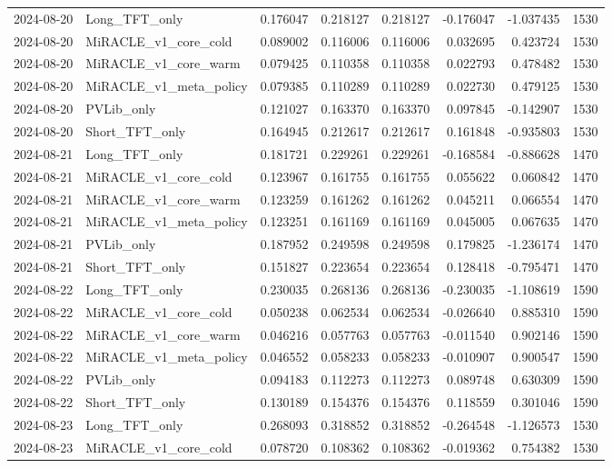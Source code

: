 \begin{tabular}{llrrrrrr}
2024-08-20 & Long_TFT_only & 0.176047 & 0.218127 & 0.218127 & -0.176047 & -1.037435 & 1530 \\
2024-08-20 & MiRACLE_v1_core_cold & 0.089002 & 0.116006 & 0.116006 & 0.032695 & 0.423724 & 1530 \\
2024-08-20 & MiRACLE_v1_core_warm & 0.079425 & 0.110358 & 0.110358 & 0.022793 & 0.478482 & 1530 \\
2024-08-20 & MiRACLE_v1_meta_policy & 0.079385 & 0.110289 & 0.110289 & 0.022730 & 0.479125 & 1530 \\
2024-08-20 & PVLib_only & 0.121027 & 0.163370 & 0.163370 & 0.097845 & -0.142907 & 1530 \\
2024-08-20 & Short_TFT_only & 0.164945 & 0.212617 & 0.212617 & 0.161848 & -0.935803 & 1530 \\
2024-08-21 & Long_TFT_only & 0.181721 & 0.229261 & 0.229261 & -0.168584 & -0.886628 & 1470 \\
2024-08-21 & MiRACLE_v1_core_cold & 0.123967 & 0.161755 & 0.161755 & 0.055622 & 0.060842 & 1470 \\
2024-08-21 & MiRACLE_v1_core_warm & 0.123259 & 0.161262 & 0.161262 & 0.045211 & 0.066554 & 1470 \\
2024-08-21 & MiRACLE_v1_meta_policy & 0.123251 & 0.161169 & 0.161169 & 0.045005 & 0.067635 & 1470 \\
2024-08-21 & PVLib_only & 0.187952 & 0.249598 & 0.249598 & 0.179825 & -1.236174 & 1470 \\
2024-08-21 & Short_TFT_only & 0.151827 & 0.223654 & 0.223654 & 0.128418 & -0.795471 & 1470 \\
2024-08-22 & Long_TFT_only & 0.230035 & 0.268136 & 0.268136 & -0.230035 & -1.108619 & 1590 \\
2024-08-22 & MiRACLE_v1_core_cold & 0.050238 & 0.062534 & 0.062534 & -0.026640 & 0.885310 & 1590 \\
2024-08-22 & MiRACLE_v1_core_warm & 0.046216 & 0.057763 & 0.057763 & -0.011540 & 0.902146 & 1590 \\
2024-08-22 & MiRACLE_v1_meta_policy & 0.046552 & 0.058233 & 0.058233 & -0.010907 & 0.900547 & 1590 \\
2024-08-22 & PVLib_only & 0.094183 & 0.112273 & 0.112273 & 0.089748 & 0.630309 & 1590 \\
2024-08-22 & Short_TFT_only & 0.130189 & 0.154376 & 0.154376 & 0.118559 & 0.301046 & 1590 \\
2024-08-23 & Long_TFT_only & 0.268093 & 0.318852 & 0.318852 & -0.264548 & -1.126573 & 1530 \\
2024-08-23 & MiRACLE_v1_core_cold & 0.078720 & 0.108362 & 0.108362 & -0.019362 & 0.754382 & 1530 \\

\end{tabular}
